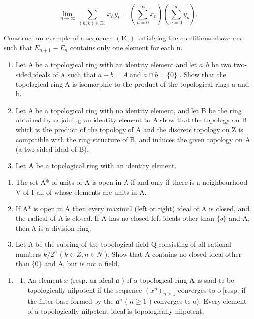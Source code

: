 \[
\lim _ {n \rightarrow \infty} \sum_ {(h, k) \in \mathrm{E} _ {n}} x _ {h} y _ {k} = \left(\underset {n = 0} {\overset {\infty} {\sum}} x _ {n}\right)\left(\underset {n = 0} {\overset {\infty} {\sum}} y _ {n}\right).
\]

Construct an example of a sequence \((\mathbf{E}_{n})\) satisfying the conditions above and such that \(E_{n+1} - E_{n}\) contains only one element for each n.

\begin{enumerate}
\def\labelenumi{\arabic{enumi})}
\setcounter{enumi}{5}
\item
  Let A be a topological ring with an identity element and let \(a, b\) be two two-sided ideals of A such that \(a + b = A\) and \(a \cap b = \{0\}\) . Show that the topological ring A is isomorphic to the product of the topological rings a and b.
\item
  Let A be a topological ring with no identity element, and let B be the ring obtained by adjoining an identity element to A show that the topology on B which is the product of the topology of A and the discrete topology on Z is compatible with the ring structure of B, and induces the given topology on A (a two-sided ideal of B).
\item
  Let \(\mathbf{A}\) be a topological ring with an identity element.
\end{enumerate}

\begin{enumerate}
\def\labelenumi{\alph{enumi})}
\item
  The set A* of units of A is open in A if and only if there is a neighbourhood V of 1 all of whose elements are units in A.
\item
  If A* is open in A then every maximal (left or right) ideal of A is closed, and the radical of A is closed. If A has no closed left ideals other than \(\{o\}\) and A, then A is a division ring.
\item
  Let A be the subring of the topological field Q consisting of all rational numbers \(k/2^{n}\) ( \(k \in Z, n \in N\) ). Show that A contains no closed ideal other than \(\{0\}\) and A, but is not a field.
\end{enumerate}

\begin{enumerate}
\def\labelenumi{\arabic{enumi})}
\setcounter{enumi}{8}
\tightlist
\item
  \begin{enumerate}
  \def\labelenumii{\alph{enumii})}
  \tightlist
  \item
    An element \(x\) (resp. an ideal \(\mathfrak{a}\) ) of a topological ring \(\mathbf{A}\) is said to be topologically nilpotent if the sequence \((x^n)_{n\geqslant 1}\) converges to o {[}resp. if the filter base formed by the \(\mathfrak{a}^n\) ( \(n\geqslant 1\) ) converges to o). Every element of a topologically nilpotent ideal is topologically nilpotent.
  \end{enumerate}
\end{enumerate}

